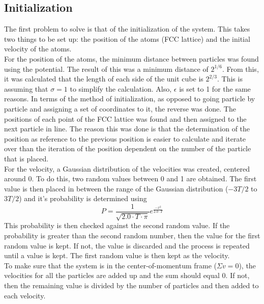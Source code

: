 \documentclass[letterpaper,12pt]{article}
\numberwithin{equation}{subsection}
\begin{document}
\subsection{Initialization}
The first problem to solve is that of the initialization of the system. This takes two things to be set up: the position of the atoms (FCC lattice) and the initial velocity of the atoms. \\
\indent For the position of the atoms, the minimum distance between particles was found using the potential. The result of this was a minimum distance of $2^{1/6}$. From this, it was calculated that the length of each side of the unit cube is $2^{2/3}$. This is assuming that $ \sigma = 1$ to simplify the calculation. Also, $\epsilon$ is set to 1 for the same reasons. In terms of the method of initialization, as opposed to going particle by particle and assigning a set of coordinates to it, the reverse was done. The positions of each point of the FCC lattice was found and then assigned to the next particle in line. The reason this was done is that the determination of the position as reference to the previous position is easier to calculate and iterate over than the iteration of the position dependent on the number of the particle that is placed. \\
\indent For the velocity, a Gaussian distribution of the velocities was created, centered around 0. To do this, two random values between 0 and 1 are obtained. The first value is then placed in between the range of the Gaussian distribution ($ -3T/2$ to $3T/2$) and it's probability is determined using
\begin{equation}
P = \frac{1}{\sqrt{2.0 \cdot T \cdot \pi}} e ^{\frac{-x^{2}}{2.0 \cdot T}}
\end{equation}
This probability is then checked against the second random value. If the probability is greater than the second random number, then the value for the first random value is kept. If not, the value is discarded and the process is repeated until a value is kept. The first random value is then kept as the velocity. \\
\indent To make sure that the system is in the center-of-momentum frame ($\Sigma v = 0$), the velocities for all the particles are added up and the sum should equal 0. If not, then the remaining value is divided by the number of particles and then added to each velocity.
\end{document}
